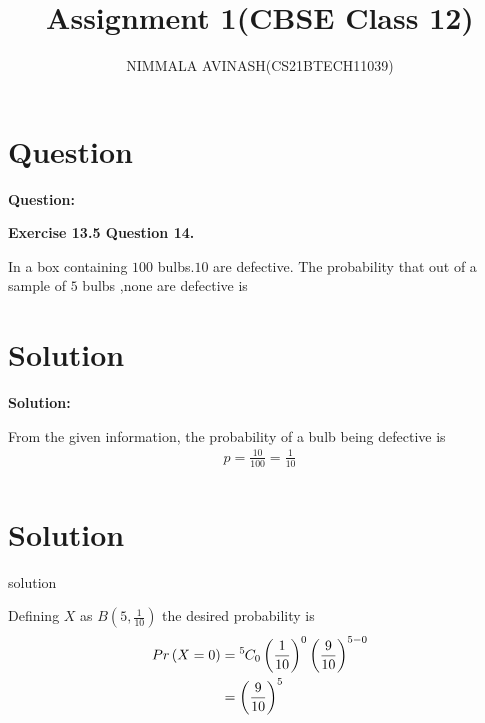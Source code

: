 \documentclass{beamer}
\title{Assignment 1(CBSE Class 12)}
\author{NIMMALA AVINASH(CS21BTECH11039)}
\providecommand{\brak}[1]{\ensuremath{\left(#1\right)}}
\newcommand*{\permcomb}[4][0mu]{{{}^{#3}\mkern#1#2_{#4}}}
\newcommand*{\comb}[1][-1mu]{\permcomb[#1]{C}}
\begin{document}
\begin{frame}
 \titlepage
\end{frame}
\section{Question}
\begin{frame}
{\Large \textbf{Question:}\\}

{\Large \textbf{Exercise 13.5 Question 14.}}

\begin{Large}

In a box containing $100$ bulbs.$10$ are defective. The probability that out of a sample of $5$ bulbs ,none are defective is \\

\end{Large}

\end{frame}

\section{Solution}
\begin{frame}
{\Large \textbf{Solution:}\\}
\begin{Large}
From the given information, the probability of a bulb being defective is
\begin{align}
p = \frac{10}{100} = \frac{1}{10}\\
\end{align}
\end{Large}
\end{frame}
\section{Solution}
\begin{frame}{solution}
\begin{Large}
Defining $X$ as $B \brak{5,\frac{1}{10}}$  the desired probability is\\
\begin{align}
    Pr\brak{X=0} &= \comb{5}{0} \brak{\frac{1}{10}}^{0} \brak{\frac{9}{10}} ^ {5-0}\\
    &= \brak{\frac{9}{10}}^5
\end{align}
\end{Large}
\end{frame}
\end{document}
